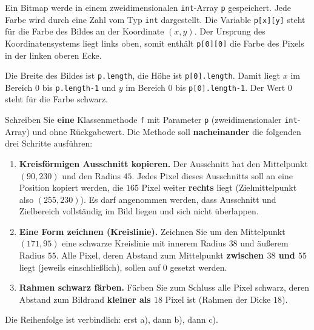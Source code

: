 \documentclass[
	fontsize=12pt,
	paper=a4,
	numbers=noenddot,
	parskip=half,
	openany
]{scrbook}
\begin{document}
Ein Bitmap werde in einem zweidimensionalen \texttt{int}-Array \texttt{p} gespeichert. Jede Farbe wird durch eine Zahl vom Typ \texttt{int} dargestellt. Die Variable \texttt{p[x][y]} steht für die Farbe des Bildes an der Koordinate $(x,y)$. Der Ursprung des Koordinatensystems liegt links oben, somit enthält \texttt{p[0][0]} die Farbe des Pixels in der linken oberen Ecke.

\begin{center}
\end{center}

Die Breite des Bildes ist \texttt{p.length}, die Höhe ist \texttt{p[0].length}. Damit liegt $x$ im Bereich $0$ bis \texttt{p.length-1} und $y$ im Bereich $0$ bis \texttt{p[0].length-1}. Der Wert $0$ steht für die Farbe schwarz.

Schreiben Sie \textbf{eine} Klassenmethode \texttt{f} mit Parameter \texttt{p} (zweidimensionaler \texttt{int}-Array) und ohne Rückgabewert. Die Methode soll \textbf{nacheinander} die folgenden drei Schritte ausführen:

\begin{enumerate}[label=\textbf{\alph*)}]
	\item \textbf{Kreisförmigen Ausschnitt kopieren.} Der Ausschnitt hat den Mittelpunkt $(90,230)$ und den Radius $45$. Jedes Pixel dieses Ausschnitts soll an eine Position kopiert werden, die $165$ Pixel weiter \textbf{rechts} liegt (Zielmittelpunkt also $(255,230)$). Es darf angenommen werden, dass Ausschnitt und Zielbereich vollständig im Bild liegen und sich nicht überlappen.
	\item \textbf{Eine Form zeichnen (Kreislinie).} Zeichnen Sie um den Mittelpunkt $(171,95)$ eine schwarze Kreislinie mit innerem Radius $38$ und äußerem Radius $55$. Alle Pixel, deren Abstand zum Mittelpunkt \textbf{zwischen $38$ und $55$} liegt (jeweils einschließlich), sollen auf $0$ gesetzt werden.
	\item \textbf{Rahmen schwarz färben.} Färben Sie zum Schluss alle Pixel schwarz, deren Abstand zum Bildrand \textbf{kleiner als $18$} Pixel ist (Rahmen der Dicke $18$).
\end{enumerate}

Die Reihenfolge ist verbindlich: erst a), dann b), dann c).
\end{document}

